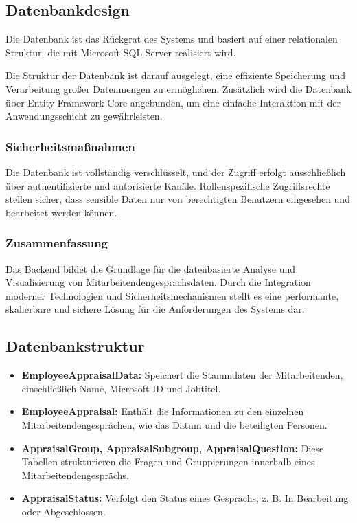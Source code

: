 \subsection{Datenbankdesign}

Die Datenbank ist das Rückgrat des Systems und basiert auf einer relationalen Struktur, die mit Microsoft SQL Server realisiert wird.

Die Struktur der Datenbank ist darauf ausgelegt, eine effiziente Speicherung und Verarbeitung großer Datenmengen zu ermöglichen. Zusätzlich wird die Datenbank über Entity Framework Core angebunden, um eine einfache Interaktion mit der Anwendungsschicht zu gewährleisten.

\subsubsection*{Sicherheitsmaßnahmen}
Die Datenbank ist vollständig verschlüsselt, und der Zugriff erfolgt ausschließlich über authentifizierte und autorisierte Kanäle. Rollenspezifische Zugriffsrechte stellen sicher, dass sensible Daten nur von berechtigten Benutzern eingesehen und bearbeitet werden können.
\cite{liu2021security}
\subsubsection*{Zusammenfassung}
Das Backend bildet die Grundlage für die datenbasierte Analyse und Visualisierung von Mitarbeitendengesprächsdaten. Durch die Integration moderner Technologien und Sicherheitsmechanismen stellt es eine performante, skalierbare und sichere Lösung für die Anforderungen des Systems dar.\cite{microsoft2020azure}


\subsection{Datenbankstruktur}
\begin{itemize}
    \item \textbf{EmployeeAppraisalData:} Speichert die Stammdaten der Mitarbeitenden, einschlie\ss lich Name, Microsoft-ID und Jobtitel.
    \item \textbf{EmployeeAppraisal:} Enth\"alt die Informationen zu den einzelnen Mitarbeitendengespr\"achen, wie das Datum und die beteiligten Personen.
    \item \textbf{AppraisalGroup, AppraisalSubgroup, AppraisalQuestion:} Diese Tabellen strukturieren die Fragen und Gruppierungen innerhalb eines Mitarbeitendengespr\"achs.
    \item \textbf{AppraisalStatus:} Verfolgt den Status eines Gespr\"achs, z. B. \glqq In Bearbeitung\grqq{} oder \glqq Abgeschlossen\grqq{}.
\end{itemize}

